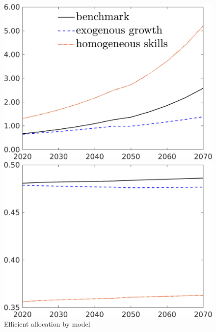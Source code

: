 \begin{figure}[h!!]
 	\centering
 	\caption{Efficient allocation by model}\label{fig:eff_model}
 	\begin{minipage}[]{0.32\textwidth}
 		\includegraphics[width=1\textwidth]{../../codding_model/own_basedOnFried/optimalPol_190722_tidiedUp/figures/all_10Aout22/EFF_CompMod_OPT_T_NoTaus_C_regime3_spillover0_noskill0_sep1_xgrowth0_extern0_PV1_etaa0.79_lgd1.png}
 	\end{minipage}
 	\begin{minipage}[]{0.32\textwidth}
 		\includegraphics[width=1\textwidth]{../../codding_model/own_basedOnFried/optimalPol_190722_tidiedUp/figures/all_10Aout22/EFF_CompMod_OPT_T_NoTaus_hh_regime3_spillover0_noskill0_sep1_xgrowth0_extern0_PV1_etaa0.79_lgd0.png}

\end{minipage}
\end{figure}

